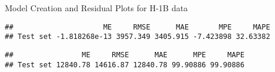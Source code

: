 \documentclass[
  ignorenonframetext,
]{beamer}
\begin{document}
\begin{frame}[fragile]{Model Creation and Residual Plots for H-1B data}
\begin{verbatim}
##                     ME     RMSE      MAE       MPE     MAPE
## Test set -1.818268e-13 3957.349 3405.915 -7.423898 32.63382
\end{verbatim}

\begin{verbatim}
##                ME     RMSE      MAE      MPE     MAPE
## Test set 12840.78 14616.87 12840.78 99.90886 99.90886
\end{verbatim}
\end{frame}
\end{document}
